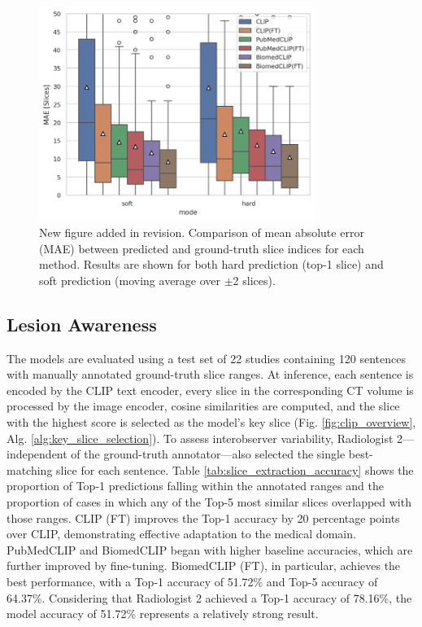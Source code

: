 \documentclass[bioengineering,article,submit,pdftex,moreauthors]{Definitions/mdpi}
\begin{document}
\begin{figure}[ht]
  \centering
  \includegraphics[width=0.8\textwidth]{./figures/mae.png}
  \caption{
    New figure added in revision.
    Comparison of mean absolute error (MAE) between predicted and ground-truth slice indices for each method. 
    Results are shown for both hard prediction (top-1 slice) and soft prediction (moving average over $\pm$2 slices).
  }
  \label{fig:mae}
\end{figure}


\subsection{Lesion Awareness}\label{sec:lesion_aware}
The models are evaluated using a test set of 22 studies containing 120 sentences with manually annotated ground-truth slice ranges. 
At inference, each sentence is encoded by the CLIP text encoder, every slice in the corresponding CT volume is processed by the image encoder, cosine similarities are computed, and the slice with the highest score is selected as the model’s key slice (Fig. \ref{fig:clip_overview}, Alg. \ref{alg:key_slice_selection}). 
To assess interobserver variability, Radiologist 2—independent of the ground-truth annotator—also selected the single best-matching slice for each sentence.
Table \ref{tab:slice_extraction_accuracy} shows the proportion of Top-1 predictions falling within the annotated ranges and the proportion of cases in which any of the Top-5 most similar slices overlapped with those ranges. 
CLIP (FT) improves the Top-1 accuracy by 20 percentage points over CLIP, demonstrating effective adaptation to the medical domain.
PubMedCLIP and BiomedCLIP began with higher baseline accuracies, which are further improved by fine-tuning. 
BiomedCLIP (FT), in particular, achieves the best performance, with a Top-1 accuracy of 51.72\% and Top-5 accuracy of 64.37\%. 
Considering that Radiologist 2 achieved a Top-1 accuracy of 78.16\%, the model accuracy of 51.72\% represents a relatively strong result.
\end{document}
